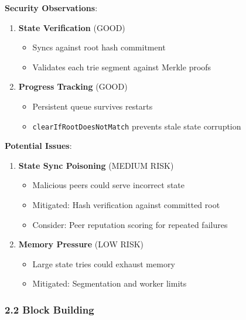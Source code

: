 \documentclass[
]{article}
\providecommand{\tightlist}{%
  \setlength{\itemsep}{0pt}\setlength{\parskip}{0pt}}
\begin{document}
\textbf{Security Observations}:

\begin{enumerate}
\def\labelenumi{\arabic{enumi}.}
\item
  \textbf{State Verification} (GOOD)

  \begin{itemize}
  \tightlist
  \item
    Syncs against root hash commitment
  \item
    Validates each trie segment against Merkle proofs
  \end{itemize}
\item
  \textbf{Progress Tracking} (GOOD)

  \begin{itemize}
  \tightlist
  \item
    Persistent queue survives restarts
  \item
    \texttt{clearIfRootDoesNotMatch} prevents stale state corruption
  \end{itemize}
\end{enumerate}

\textbf{Potential Issues}:

\begin{enumerate}
\def\labelenumi{\arabic{enumi}.}
\item
  \textbf{State Sync Poisoning} (MEDIUM RISK)

  \begin{itemize}
  \tightlist
  \item
    Malicious peers could serve incorrect state
  \item
    Mitigated: Hash verification against committed root
  \item
    Consider: Peer reputation scoring for repeated failures
  \end{itemize}
\item
  \textbf{Memory Pressure} (LOW RISK)

  \begin{itemize}
  \tightlist
  \item
    Large state tries could exhaust memory
  \item
    Mitigated: Segmentation and worker limits
  \end{itemize}
\end{enumerate}

\subsubsection{2.2 Block Building}\label{22-block-building}
\end{document}
